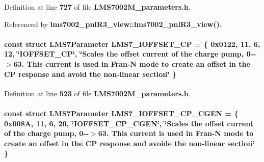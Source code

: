 Definition at line {\bf 727} of file {\bf L\+M\+S7002\+M\+\_\+parameters.\+h}.



Referenced by {\bf lms7002\+\_\+pnl\+R3\+\_\+view\+::lms7002\+\_\+pnl\+R3\+\_\+view()}.

\paragraph[{L\+M\+S7\+\_\+\+I\+O\+F\+F\+S\+E\+T\+\_\+\+CP}]{\setlength{\rightskip}{0pt plus 5cm}const struct {\bf L\+M\+S7\+Parameter} L\+M\+S7\+\_\+\+I\+O\+F\+F\+S\+E\+T\+\_\+\+CP = \{ 0x0122, 11, 6, 12, \char`\"{}\+I\+O\+F\+F\+S\+E\+T\+\_\+\+C\+P\char`\"{}, \char`\"{}\+Scales the offset current of the charge pump, 0-\/-\/$>$63. This current is used in Fran-\/\+N mode to create an offset in the C\+P response and avoid the non-\/linear section\char`\"{} \}\hspace{0.3cm}{\ttfamily [static]}}\label{LMS7002M__parameters_8h_a389043d61f87107ad2fb692870f86195}


Definition at line {\bf 523} of file {\bf L\+M\+S7002\+M\+\_\+parameters.\+h}.

\paragraph[{L\+M\+S7\+\_\+\+I\+O\+F\+F\+S\+E\+T\+\_\+\+C\+P\+\_\+\+C\+G\+EN}]{\setlength{\rightskip}{0pt plus 5cm}const struct {\bf L\+M\+S7\+Parameter} L\+M\+S7\+\_\+\+I\+O\+F\+F\+S\+E\+T\+\_\+\+C\+P\+\_\+\+C\+G\+EN = \{ 0x008\+A, 11, 6, 20, \char`\"{}\+I\+O\+F\+F\+S\+E\+T\+\_\+\+C\+P\+\_\+\+C\+G\+E\+N\char`\"{}, \char`\"{}\+Scales the offset current of the charge pump, 0-\/-\/$>$63. This current is used in Fran-\/\+N mode to create an offset in the C\+P response and avoide the non-\/linear section\char`\"{} \}\hspace{0.3cm}{\ttfamily [static]}}\label{LMS7002M__parameters_8h_a7fae8e1f51655f340ad1d847cb9024e7}


